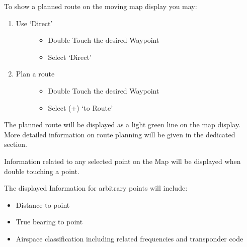 \documentclass[letterpaper,10pt,english]{sphinxmanual}
\begin{document}
\sphinxAtStartPar
To show a planned route on the moving map display you may:
\begin{enumerate}
%
\item {} \begin{description}
\item[{Use ‘Direct’}] \leavevmode\begin{itemize}
\item {} 
\sphinxAtStartPar
Double Touch the desired Waypoint

\item {} 
\sphinxAtStartPar
Select ‘Direct’

\end{itemize}

\end{description}

\item {} \begin{description}
\item[{Plan a route}] \leavevmode\begin{itemize}
\item {} 
\sphinxAtStartPar
Double Touch the desired Waypoint

\item {} 
\sphinxAtStartPar
Select (+) ‘to Route’

\end{itemize}

\end{description}

\end{enumerate}

\sphinxAtStartPar
The planned route will be displayed as a light green line on the map
display. More detailed information on route planning will be given in the
dedicated section.

\sphinxAtStartPar
{}

\sphinxAtStartPar
Information related to any selected point on the Map will be displayed when
double touching a point.

\sphinxAtStartPar
The displayed Information for arbitrary points will include:
\begin{itemize}
\item {} 
\sphinxAtStartPar
Distance to point

\item {} 
\sphinxAtStartPar
True bearing to point

\item {} 
\sphinxAtStartPar
Airspace classification including related frequencies and transponder code

\end{itemize}
\end{document}
